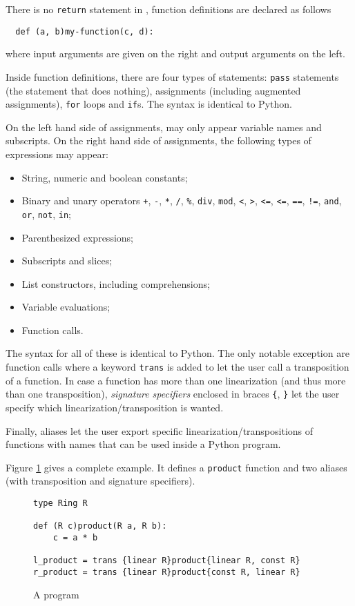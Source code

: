 There is no \lstinline+return+ statement in \tALpy{}, function
definitions are declared as follows
\begin{lstlisting}
  def (a, b)my-function(c, d):
\end{lstlisting}
where input arguments are given on the right and output arguments on
the left.

Inside function definitions, there are four types of statements:
\lstinline+pass+ statements (the statement that does nothing),
assignments (including augmented assignments), \lstinline+for+ loops
and \lstinline+if+s. The syntax is identical to Python.

On the left hand side of assignments, may only appear variable names
and subscripts. On the right hand side of assignments, the following
types of expressions may appear:
\begin{itemize}
\item String, numeric and boolean constants;
\item Binary and unary operators \lstinline-+-, \lstinline+-+,
  \lstinline+*+, \lstinline+/+,
  \lstinline+%+, \lstinline+div+, \lstinline+mod+, \lstinline+<+,
  \lstinline+>+, \lstinline+<=+, \lstinline+<=+, \lstinline+==+,
  \lstinline+!=+, \lstinline+and+, \lstinline+or+, \lstinline+not+,
  \lstinline+in+;
\item Parenthesized expressions;
\item Subscripts and slices;
\item List constructors, including comprehensions;
\item Variable evaluations;
\item Function calls.
\end{itemize}
The syntax for all of these is identical to Python. The only notable
exception are function calls where a keyword \lstinline+trans+ is
added to let the user call a transposition of a function. In case a
function has more than one linearization (and thus more than one
transposition), \emph{signature specifiers} enclosed in braces
\lstinline+{+, \lstinline+}+ let the user specify which
linearization/transposition is wanted.

Finally, aliases let the user export specific
linearization/transpositions of functions with names that can be used
inside a Python program.

Figure \ref{fig:prog} gives a complete \tALpy{} example. It defines a
\lstinline+product+ function and two aliases (with transposition and
signature specifiers).

\begin{figure}[!ht]
  \centering
\begin{lstlisting}
type Ring R

def (R c)product(R a, R b):
    c = a * b
  
l_product = trans {linear R}product{linear R, const R}
r_product = trans {linear R}product{const R, linear R}
\end{lstlisting}
  
  \caption{A \tALpy{} program}
  \label{fig:prog}
\end{figure}

